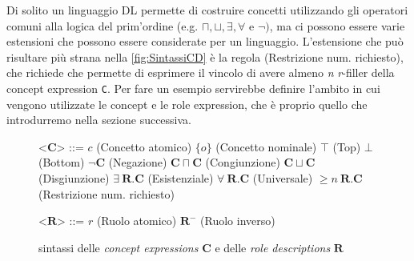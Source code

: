 Di solito un linguaggio DL permette di costruire concetti utilizzando gli operatori comuni alla logica del prim’ordine (e.g. $\sqcap, \sqcup, \exists, \forall \text{ e } \neg)$, ma ci possono essere varie estensioni che possono essere considerate per un linguaggio. L'estensione che può risultare più strana nella \autoref{fig:SintassiCD} è la regola (Restrizione num. richiesto), che richiede che permette di esprimere il vincolo di avere almeno \textit{n} \textit{r}-filler della concept expression \texttt{C}. Per fare un esempio servirebbe definire l'ambito in cui vengono utilizzate le concept e le role expression, che è proprio quello che introdurremo nella sezione successiva.\\
\begin{figure}[b!]
	\begin{center}	
		\begin{minipage}{0.6\textwidth}
			\setlength{\grammarindent}{3em} %
			\begin{grammar}
				\let\syntleft\relax
				\let\syntright\relax
				<$\mathbf{C}$> ::= $c$ \hfill (Concetto atomico)
				\alt $\{o\}$ \hfill (Concetto nominale)
				\alt $\top$ \hfill (Top)
				\alt $\bot$ \hfill (Bottom)
				\alt $\neg \mathbf{C} $ \hfill (Negazione)
				\alt $\mathbf{C} \sqcap \mathbf{C}$ \hfill (Congiunzione)
				\alt $\mathbf{C} \sqcup \mathbf{C}$ \hfill (Disgiunzione)
				\alt $\exists\ \mathbf{R}. \mathbf{C}$ \hfill (Esistenziale)
				\alt $\forall\ \mathbf{R}. \mathbf{C}$ \hfill (Universale)
				\alt $\ge n\ \mathbf{R} . \mathbf{C}$ \hfill (Restrizione num. richiesto)
				
				<$\mathbf{R}$> ::= $r$ \hfill (Ruolo atomico)
				\alt $\mathbf{R}^-$ \hfill (Ruolo inverso)
			\end{grammar}
		\end{minipage}
		\caption{sintassi delle \textit{concept expressions} $\mathbf{C}$ e delle \textit{role descriptions} $\mathbf{R}$}
		\label{fig:SintassiCD}
	\end{center}
\end{figure}


